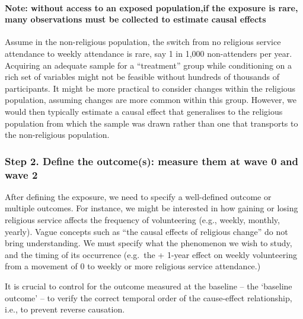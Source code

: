 \documentclass[
  singlecolumn]{article}
\let\oldparagraph\paragraph
\renewcommand{\paragraph}[1]{\oldparagraph{#1}\mbox{}}
\begin{document}
\hypertarget{note-without-access-to-an-exposed-populationif-the-exposure-is-rare-many-observations-must-be-collected-to-estimate-causal-effects}{%
\paragraph{\texorpdfstring{\textbf{Note: without access to an exposed
population,if the exposure is rare, many observations must be collected
to estimate causal
effects}}{Note: without access to an exposed population,if the exposure is rare, many observations must be collected to estimate causal effects}}\label{note-without-access-to-an-exposed-populationif-the-exposure-is-rare-many-observations-must-be-collected-to-estimate-causal-effects}}

Assume in the non-religious population, the switch from no religious
service attendance to weekly attendance is rare, say 1 in 1,000
non-attenders per year. Acquiring an adequate sample for a ``treatment''
group while conditioning on a rich set of variables might not be
feasible without hundreds of thousands of participants. It might be more
practical to consider changes within the religious population, assuming
changes are more common within this group. However, we would then
typically estimate a causal effect that generalises to the religious
population from which the sample was drawn rather than one that
transports to the non-religious population.

\hypertarget{step-2.-define-the-outcomes-measure-them-at-wave-0-and-wave-2}{%
\subsubsection{Step 2. Define the outcome(s): measure them at wave 0 and
wave
2}\label{step-2.-define-the-outcomes-measure-them-at-wave-0-and-wave-2}}

After defining the exposure, we need to specify a well-defined outcome
or multiple outcomes. For instance, we might be interested in how
gaining or losing religious service affects the frequency of
volunteering (e.g., weekly, monthly, yearly). Vague concepts such as
``the causal effects of religious change'' do not bring understanding.
We must specify what the phenomenon we wish to study, and the timing of
its occurrence (e.g.~the + 1-year effect on weekly volunteering from a
movement of 0 to weekly or more religious service attendance.)

It is crucial to control for the outcome measured at the baseline -- the
`baseline outcome' -- to verify the correct temporal order of the
cause-effect relationship, i.e., to prevent reverse causation.
\end{document}
